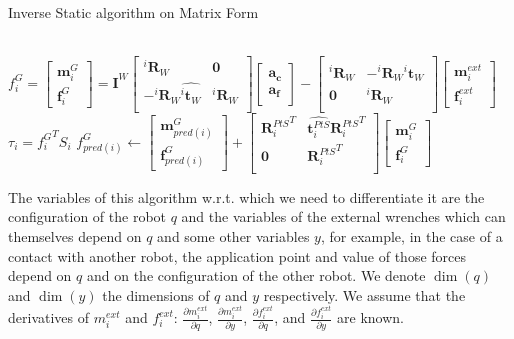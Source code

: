 \begin{algorithm}
  \caption{Inverse Static algorithm on Matrix Form}
\label{alg:ISmatrix}
\begin{algorithmic}
  \\
  $f^G_i =
  \begin{bmatrix}
    \mathbf{m}^{G}_i \\ \mathbf{f}^{G}_i
  \end{bmatrix}
  =
  \mathbf{I}^W
  \begin{bmatrix}
    {{}^i\mathbf{R}_W} & \mathbf{0} \\
    -{{}^i\mathbf{R}_W}\widehat{{}^i\mathbf{t}_W} & {{}^i\mathbf{R}_W} \\
  \end{bmatrix}
  \begin{bmatrix}
    \mathbf{a_c} \\ \mathbf{a_f}
  \end{bmatrix}
  -
  \begin{bmatrix}
    {{}^i\mathbf{R}_W} & -{{}^i\mathbf{R}_W}\widehat{{}^i\mathbf{t}_W} \\
    \mathbf{0} & {{}^i\mathbf{R}_W} \\
  \end{bmatrix}
  \begin{bmatrix}
    \mathbf{m}^{ext}_i \\ \mathbf{f}^{ext}_i
  \end{bmatrix}
  $
  \EndFor{}
  \State$\tau_i = {f^G_i}^T S_i$
  \State$f^G_{pred(i)} \leftarrow
  \begin{bmatrix}
    \mathbf{m}^{G}_{pred(i)} \\ \mathbf{f}^{G}_{pred(i)}
  \end{bmatrix}
  +
  \begin{bmatrix}
    {\mathbf{R}^{PtS}_i}^T & \widehat{\mathbf{t}^{PtS}_i}{\mathbf{R}^{PtS}_i}^T \\
    \mathbf{0} & {\mathbf{R}^{PtS}_i}^T \\
  \end{bmatrix}
  \begin{bmatrix}
    \mathbf{m}^{G}_i \\ \mathbf{f}^{G}_i
  \end{bmatrix}
  $
  \EndIf{}
  \EndFor{}
\end{algorithmic}
\end{algorithm}

The variables of this algorithm w.r.t. which we need to differentiate it are the configuration of the robot $q$ and the variables of the external wrenches which can themselves depend on $q$ and some other variables $y$, for example, in the case of a contact with another robot, the application point and value of those forces depend on $q$ and on the configuration of the other robot.
We denote $\dim(q)$ and $\dim(y)$ the dimensions of $q$ and $y$ respectively.
We assume that the derivatives of $m_i^{ext}$ and $f_i^{ext}$: $\frac{\partial m_i^{ext}}{\partial q}$, $\frac{\partial m_i^{ext}}{\partial y}$, $\frac{\partial f_i^{ext}}{\partial q}$, and $\frac{\partial f_i^{ext}}{\partial y}$ are known.

